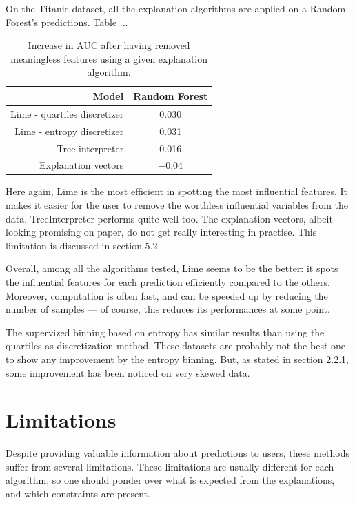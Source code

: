 \documentclass[a4paper,11pt]{kth-mag}
\begin{document}
On the Titanic dataset, all the explanation algorithms are applied on a Random Forest's predictions. Table ... 

\begin{table}[ht]
\centering
  \begin{tabular}{|r|c|}
  	  \hline
	 Model &  \cellcolor{Gray} Random Forest \\ \hline
	 Lime - quartiles discretizer & 0.030\\ \hline
	 Lime - entropy discretizer & 0.031\\ \hline
	 Tree interpreter & 0.016\\ \hline
	 Explanation vectors & $-0.04$\\ \hline
  \end{tabular}
  \caption{Increase in AUC after having removed meaningless features using a given explanation algorithm.}
\end{table}

Here again, Lime is the most efficient in spotting the most influential features. It makes it easier for the user to remove the worthless influential variables from the data. TreeInterpreter performs quite well too. The explanation vectors, albeit looking promising on paper, do not get really interesting in practise. This limitation is discussed in section 5.2.

Overall, among all the algorithms tested, Lime seems to be the better: it spots the influential features for each prediction efficiently compared to the others. Moreover, computation is often fast, and can be speeded up by reducing the number of samples --- of course, this reduces its performances at some point.

The supervized binning based on entropy has similar results than using the quartiles as discretization method. These datasets are probably not the best one to show any improvement by the entropy binning. But, as stated in section  2.2.1, some improvement has been noticed on very skewed data.

\section{Limitations}

Despite providing valuable information about predictions to users, these methods suffer from several limitations. These limitations are usually different for each algorithm, so one should ponder over what is expected from the explanations, and which constraints are present.
\end{document}
